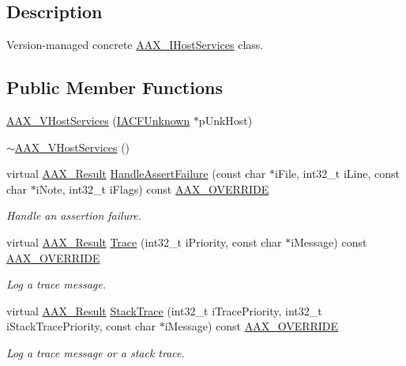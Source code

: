 \subsection{Description}
Version-\/managed concrete \hyperlink{a00103}{A\+A\+X\+\_\+\+I\+Host\+Services} class. \subsection*{Public Member Functions}
\begin{DoxyCompactItemize}
\item 
\hyperlink{a00137_aca30ba0a74f2b75fbb82312cd8f1ec8b}{A\+A\+X\+\_\+\+V\+Host\+Services} (\hyperlink{a00146}{I\+A\+C\+F\+Unknown} $\ast$p\+Unk\+Host)
\item 
\hyperlink{a00137_af09ee3e002855a7d9becad700a5b989e}{$\sim$\+A\+A\+X\+\_\+\+V\+Host\+Services} ()
\item 
virtual \hyperlink{a00149_a4d8f69a697df7f70c3a8e9b8ee130d2f}{A\+A\+X\+\_\+\+Result} \hyperlink{a00137_ad3164941ea8856cf8367776c81fee242}{Handle\+Assert\+Failure} (const char $\ast$i\+File, int32\+\_\+t i\+Line, const char $\ast$i\+Note, int32\+\_\+t i\+Flags) const \hyperlink{a00149_ac2f24a5172689ae684344abdcce55463}{A\+A\+X\+\_\+\+O\+V\+E\+R\+R\+I\+D\+E}
\begin{DoxyCompactList}\small\item\em Handle an assertion failure. \end{DoxyCompactList}\item 
virtual \hyperlink{a00149_a4d8f69a697df7f70c3a8e9b8ee130d2f}{A\+A\+X\+\_\+\+Result} \hyperlink{a00137_af06d4c4839efaa6225327e10755cdbd3}{Trace} (int32\+\_\+t i\+Priority, const char $\ast$i\+Message) const \hyperlink{a00149_ac2f24a5172689ae684344abdcce55463}{A\+A\+X\+\_\+\+O\+V\+E\+R\+R\+I\+D\+E}
\begin{DoxyCompactList}\small\item\em Log a trace message. \end{DoxyCompactList}\item 
virtual \hyperlink{a00149_a4d8f69a697df7f70c3a8e9b8ee130d2f}{A\+A\+X\+\_\+\+Result} \hyperlink{a00137_a011c22722d1c27796b2e86ef12edb1d8}{Stack\+Trace} (int32\+\_\+t i\+Trace\+Priority, int32\+\_\+t i\+Stack\+Trace\+Priority, const char $\ast$i\+Message) const \hyperlink{a00149_ac2f24a5172689ae684344abdcce55463}{A\+A\+X\+\_\+\+O\+V\+E\+R\+R\+I\+D\+E}
\begin{DoxyCompactList}\small\item\em Log a trace message or a stack trace. \end{DoxyCompactList}\end{DoxyCompactItemize}


